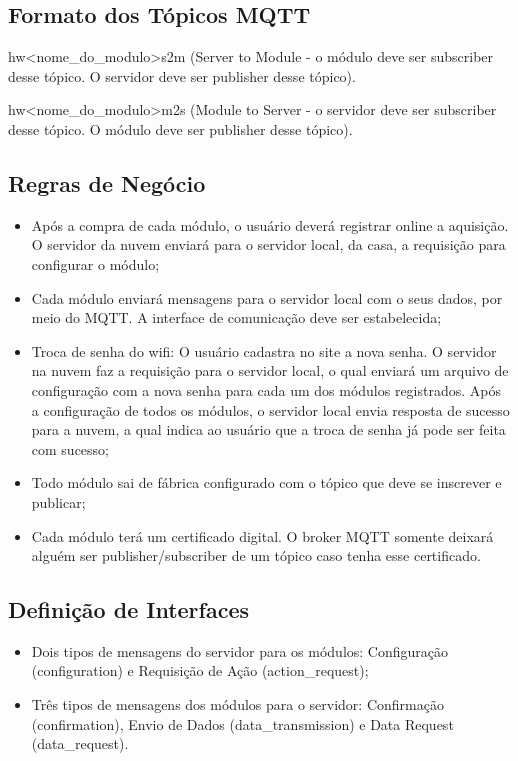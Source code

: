 \subsection{Formato dos Tópicos MQTT}
hw\/\textless nome\_do\_modulo\textgreater	\/s2m (Server to Module - o módulo deve ser subscriber desse tópico. O servidor deve ser publisher desse tópico).

hw\/\textless nome\_do\_modulo\textgreater	\/m2s (Module to Server - o servidor deve ser subscriber desse tópico. O módulo deve ser publisher desse tópico).

\subsection{Regras de Negócio}

\begin{itemize}
\item Após a compra de cada módulo, o usuário deverá registrar online a aquisição. O servidor da nuvem enviará para o servidor local, da casa, a requisição para configurar o módulo;
\item Cada módulo enviará mensagens para o servidor local com o seus dados, por meio do MQTT. A interface de comunicação deve ser estabelecida;
\item Troca de senha do wifi: O usuário cadastra no site a nova senha. O servidor na nuvem faz a requisição para o servidor local, o qual enviará um arquivo de configuração com a nova senha para cada um dos módulos registrados. Após a configuração de todos os módulos, o servidor local envia resposta de sucesso para a nuvem, a qual indica ao usuário que a troca de senha já pode ser feita com sucesso;
\item Todo módulo sai de fábrica configurado com o tópico que deve se inscrever e publicar;
\item Cada módulo terá um certificado digital. O broker MQTT somente deixará alguém ser publisher/subscriber de um tópico caso tenha esse certificado.
\end{itemize}

\subsection{Definição de Interfaces}
\begin{itemize}
\item Dois tipos de mensagens do servidor para os módulos: Configuração (configuration) e Requisição de Ação (action\_request);
\item Três tipos de mensagens dos módulos para o servidor: Confirmação (confirmation), Envio de Dados (data\_transmission) e Data Request (data\_request).
\end{itemize}


